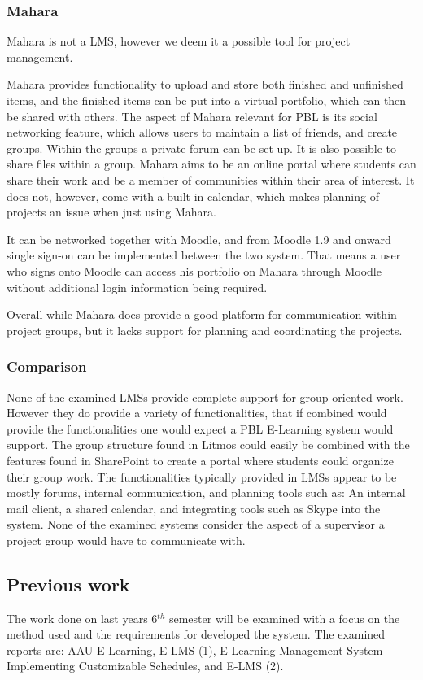 \subsubsection{Mahara}
Mahara is not a LMS, however we deem it a possible tool for project management.

Mahara provides functionality to upload and store both finished and unfinished items, and the finished items can be put into a virtual portfolio, which can then be shared with others.
The aspect of Mahara relevant for PBL is its social networking feature, which allows users to maintain a list of friends, and create groups.
Within the groups a private forum can be set up. 
It is also possible to share files within a group.
Mahara aims to be an online portal where students can share their work and be a member of communities within their area of interest.
It does not, however, come with a built-in calendar, which makes planning of projects an issue when just using Mahara.

It can be networked together with Moodle, and from Moodle 1.9 and onward single sign-on can be implemented between the two system.
That means a user who signs onto Moodle can access his portfolio on Mahara through Moodle without additional login information being required.

Overall while Mahara does provide a good platform for communication within project groups, but it lacks support for planning and coordinating the projects.

\subsubsection{Comparison}
None of the examined LMSs provide complete support for group oriented work.
However they do provide a variety of functionalities, that if combined would provide the functionalities one would expect a PBL E-Learning system would support.
The group structure found in Litmos could easily be combined with the features found in SharePoint to create a portal where students could organize their group work.
The functionalities typically provided in LMSs appear to be mostly forums, internal communication, and planning tools such as: An internal mail client, a shared calendar, and integrating tools such as Skype into the system.
None of the examined systems consider the aspect of a supervisor a project group would have to communicate with.

\subsection{Previous work}
The work done on last years 6$^{th}$ semester will be examined with a focus on the method used and the requirements for developed the system. 
The examined reports are: AAU E-Learning, E-LMS (1), E-Learning Management System - Implementing Customizable Schedules, and E-LMS (2).


